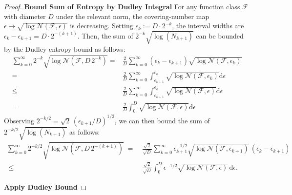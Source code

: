 \documentclass[12pt]{article}
\begin{document}
\begin{proof}
\noindent\textbf{Bound Sum of Entropy by Dudley Integral}
For any function class $\mathcal{F}$ with diameter $D$ under the relevant norm, the covering-number map $\epsilon\mapsto\sqrt{\log\mathcal{N}(\mathcal{F},\epsilon)}$ is decreasing. Setting $\epsilon_k := D\cdot 2^{-k}$, the interval widths are $\epsilon_k - \epsilon_{k+1} = D\cdot 2^{-(k+1)}$. Then, the  sum of $2^{-k}\sqrt{\log(N_{k+1})}$ can be bounded by the Dudley entropy bound as follows:
\begin{align*}
     \sum_{k=0}^\infty 2^{-k}\sqrt{\log\mathcal{N}(\mathcal{F},D\,2^{-k})}
     =  & \frac{2}{D}\sum_{k=0}^\infty (\epsilon_{k}-\epsilon_{k+1})\sqrt{\log\mathcal{N}(\mathcal{F},\epsilon_{k})}\\
     = & \frac{2}{D}\sum_{k=0}^\infty\int_{\epsilon_{k+1}}^{\epsilon_{k}} \sqrt{\log\mathcal{N}(\mathcal{F},\epsilon_{k})} \mathrm{d}\epsilon\\
     \leq & \frac{2}{D}\sum_{k=0}^\infty\int_{\epsilon_{k+1}}^{\epsilon_{k}} \sqrt{\log\mathcal{N}(\mathcal{F},\epsilon)} \mathrm{d}\epsilon\\
     = & \frac{2}{D}\int_{0}^{D}\sqrt{\log\mathcal{N}(\mathcal{F},\epsilon)} \mathrm{d}\epsilon
\end{align*}
Observing $2^{-k/2} = \sqrt{2}\,(\epsilon_{k+1}/D)^{1/2}$, we can then bound the sum of $2^{-k/2}\sqrt{\log(N_{k+1})}$ as follows:
\begin{align*}
    \sum_{k=0}^\infty 2^{-k/2}\sqrt{\log\mathcal{N}(\mathcal{F},D\,2^{-(k+1)})}
\;=&\; \frac{\sqrt{2}}{\sqrt{D}}\sum_{k=0}^\infty\epsilon_{k+1}^{-1/2}\sqrt{\log\mathcal{N}(\mathcal{F},\epsilon_{k+1})}\,(\epsilon_k-\epsilon_{k+1})\\
\;\leq&\; \frac{\sqrt{2}}{\sqrt{D}}\int_0^D\!\epsilon^{-1/2}\sqrt{\log\mathcal{N}(\mathcal{F},\epsilon)}\,\mathrm{d}\epsilon.
\end{align*}

\noindent\textbf{Apply Dudley Bound}


\end{proof}
\end{document}
